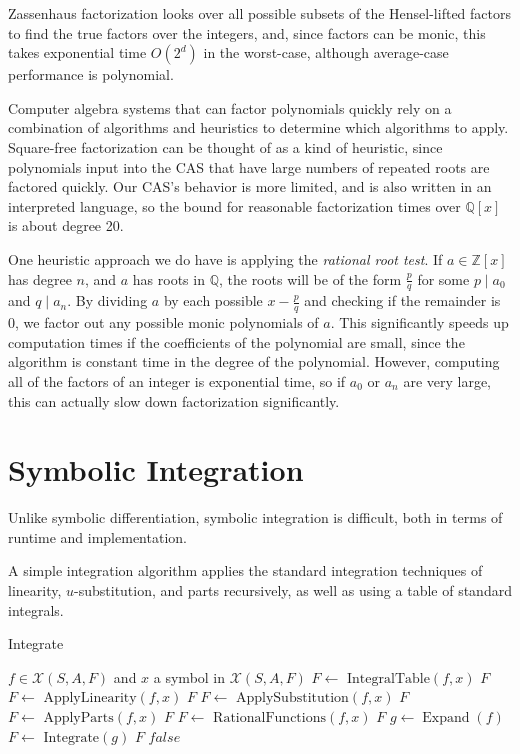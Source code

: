 \documentclass{article}
\theoremstyle{definition}
\DeclareMathOperator{\expand}{Expand}
\begin{document}
Zassenhaus factorization looks over all possible subsets of the Hensel-lifted factors to find the true factors over the integers, and, since factors can be monic, this takes exponential time $O(2^d)$ in the worst-case, although average-case performance is polynomial.

Computer algebra systems that can factor polynomials quickly rely on a combination of algorithms and heuristics to determine which algorithms to apply. Square-free factorization can be thought of as a kind of heuristic, since polynomials input into the CAS that have large numbers of repeated roots are factored quickly. Our CAS's behavior is more limited, and is also written in an interpreted language, so the bound for reasonable factorization times over $\mathbb{Q}[x]$ is about degree 20. 

One heuristic approach we do have is applying the \emph{rational root test}. If $a \in \mathbb{Z}[x]$ has degree $n$, and $a$ has roots in $\mathbb{Q}$, the roots will be of the form $\frac{p}{q}$ for some $p\mid a_0$ and $q\mid a_n$. By dividing $a$ by each possible $x-\frac{p}{q}$ and checking if the remainder is 0, we factor out any possible monic polynomials of $a$. This significantly speeds up computation times if the coefficients of the polynomial are small, since the algorithm is constant time in the degree of the polynomial. However, computing all of the factors of an integer is exponential time, so if $a_0$ or $a_n$ are very large, this can actually slow down factorization significantly. 

\section{Symbolic Integration}

Unlike symbolic differentiation, symbolic integration is difficult, both in terms of runtime and implementation. 

A simple integration algorithm applies the standard integration techniques of linearity, $u$-substitution, and parts recursively, as well as using a table of standard integrals. \cite{casc2}


\begin{algorithm}\small
\caption{Integrate}
    \begin{algorithmic}[1]
        \Require $f \in \mathcal{X}(S, A, F)$ and $x$ a symbol in $\mathcal{X}(S, A, F)$
        \State $F \gets \text{ IntegralTable}(f,x)$
         \State \Return $F$ \EndIf
               \State $F \gets \text{ ApplyLinearity}(f,x)$
         \State \Return $F$ \EndIf
        \State $F \gets \text{ ApplySubstitution}(f,x)$
         \State \Return $F$ \EndIf
        \State $F \gets \text{ ApplyParts}(f,x)$
         \State \Return $F$ \EndIf
                \State $F \gets \text{ RationalFunctions}(f,x)$
         \State \Return $F$ \EndIf
        \State $g \gets \expand(f)$
        \State $F \gets \text{ Integrate}(g)$
         \State \Return $F$ \EndIf
        \EndIf
        \State \Return $false$
    \end{algorithmic}
\end{algorithm}
\end{document}
